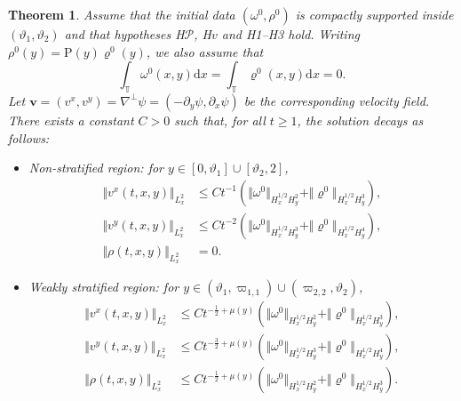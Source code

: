 \documentclass[11pt,reqno]{amsproc}
\newcounter{bigthm}
\newtheorem{bigtheorem}[bigthm]{Theorem}
\theoremstyle{definition}
\numberwithin{equation}{section}
\newcommand{\T}{{\mathbb T}}
\renewcommand{\o}{{\omega}}
\renewcommand{\d}{\mathrm{d}}
\renewcommand{\v}{\boldsymbol{v}}
\renewcommand{\P}{{\mathcal{P}}}
\newcommand{\p}{\partial}
\begin{document}
\begin{bigtheorem}\label{thm:mainID}
Assume that the initial data $(\o^0,\rho^0)$ is compactly supported inside $(\vartheta_1, \vartheta_2)$ and that hypotheses {H$\P$, H$v$} and H1--H3 hold. Writing $\rho^0(y) = \mathrm{P}(y)\varrho^0(y)$, we also assume that
\begin{equation}\label{eq:zeroxave}
\int_\T \o^0(x,y)\d x = \int_\T\varrho^0(x,y)\d x =0.
\end{equation}
Let $\v=(v^x,v^y)=\nabla^\perp\psi=(-\p_y\psi,\p_x\psi)$ be the corresponding velocity field. There exists a constant $C>0$ such that, for all $t\geq 1$, the solution decays as follows:
\begin{itemize}
\item {\em Non-stratified region:} for $y\in [0,\vartheta_1] \cup [\vartheta_2,2]$,
\begin{align}
\Vert v^x(t,x,y) \Vert_{L^2_x}    &\leq C t^{-1} \left(  \Vert \omega^0 \Vert_{H^{1/2}_x H^2_y} + \Vert \varrho^0 \Vert_{H^{1/2}_x H^3_y}\right), \label{eq:decayvxnonstrat} \\
\Vert v^y(t,x,y) \Vert_{L^2_x}  &\leq C t^{-2}\left(  \Vert \omega^0 \Vert_{H^{1/2}_x H^3_y} + \Vert \varrho^0 \Vert_{H^{1/2}_x H^4_y}\right),\label{eq:decayvynonstrat}\\
\Vert \rho(t,x,y) \Vert_{L^2_x} &= 0. \label{eq:decayrhononstrat} 
\end{align}

\item {\em Weakly stratified region:} for $y\in (\vartheta_1, \varpi_{1,1}) \cup (\varpi_{2,2}, \vartheta_2)$,
\begin{align}
\Vert v^x(t,x,y) \Vert_{L^2_x}  & \leq C t^{-\frac12+\mu(y)} \left(  \Vert \omega^0 \Vert_{H^{1/2}_x H^2_y} + \Vert \varrho^0 \Vert_{H^{1/2}_x H^3_y}\right), \label{eq:decayvxweak} \\
\Vert v^y(t,x,y) \Vert_{L^2_x}  &\leq C t^{-\frac32+\mu(y)}\left(  \Vert \omega^0 \Vert_{H^{1/2}_x H^3_y} + \Vert \varrho^0 \Vert_{H^{1/2}_x H^4_y}\right),\label{eq:decayvyweak}\\
\Vert \rho(t,x,y) \Vert_{L^2_x} &\leq C t^{-\frac12+\mu(y)} \left(  \Vert \omega^0 \Vert_{H^{1/2}_x H^2_y} + \Vert \varrho^0 \Vert_{H^{1/2}_x H^3_y}\right). \label{eq:decayrhoweak} 
\end{align}


\end{itemize}
\end{bigtheorem}
\end{document}
